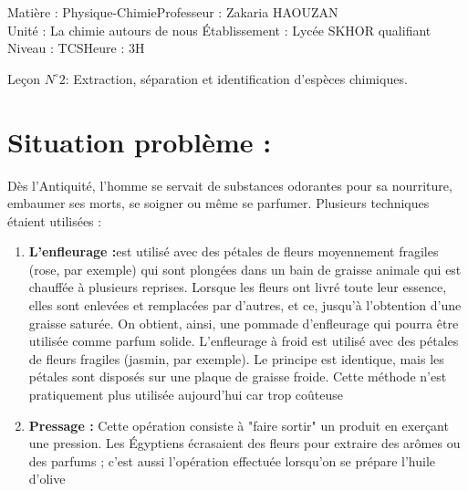 \documentclass[12pt]{article}
\author{Zakaria HAOUZAN}
\date{\today}
\newcommand\headerMe[2]{\noindent{}#1\hfill#2}
\begin{document}
\headerMe{Matière : Physique-Chimie}{Professeur : Zakaria HAOUZAN}\\
\headerMe{Unité : La chimie autours de nous }{Établissement : Lycée SKHOR qualifiant}\\
\headerMe{Niveau : TCS}{Heure : 3H}\\

\begin{center}

    \Large{Leçon $N^{\circ} 2 $: \color{red} Extraction, séparation et identification d'espèces chimiques.}
\end{center}


\section{Situation problème :  }
Dès l’Antiquité, l’homme se servait de substances odorantes pour sa nourriture, embaumer ses morts, se soigner
ou même se parfumer. Plusieurs techniques étaient utilisées :

\begin{enumerate}
	\item \textbf{L’enfleurage :}est utilisé avec des pétales de fleurs
moyennement fragiles (rose, par exemple) qui sont plongées
dans un bain de graisse animale qui est chauffée à plusieurs
reprises. Lorsque les fleurs ont livré toute leur essence, elles
sont enlevées et remplacées par d’autres, et ce, jusqu’à
l’obtention d’une graisse saturée. On obtient, ainsi, une 
pommade  d’enfleurage qui pourra être utilisée comme parfum solide.
L’enfleurage à froid est utilisé avec des pétales de fleurs fragiles (jasmin, par exemple). Le principe est
identique, mais les pétales sont disposés sur une plaque de graisse froide. Cette méthode n’est pratiquement
plus utilisée aujourd’hui car trop coûteuse

\item \textbf{Pressage :} Cette opération consiste à "faire sortir"  un
produit en exerçant une pression. Les Égyptiens écrasaient des
fleurs pour extraire des arômes ou des parfums ; c’est aussi
l’opération effectuée lorsqu’on se prépare l’huile d’olive
\end{enumerate}


\vspace{-1cm}
\end{document}
